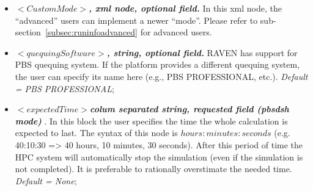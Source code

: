\begin{itemize}
\item $<CustomMode>$\textbf{\textit{, xml node, optional field.}} In this xml node, the ``advanced'' users can implement a newer ``mode''. Please refer to sub-section~\ref{subsec:runinfoadvanced} for advanced users.

\item $<quequingSoftware>$\textbf{\textit{, string, optional field.}} RAVEN has support for PBS quequing system. If the platform provides a different quequing system, the user can specify its name here (e.g., PBS PROFESSIONAL, etc.). \textit{Default = PBS PROFESSIONAL};

\item $<expectedTime>$\textbf{\textit{colum separated string, requested field (pbsdsh mode) }}. In this block the user specifies the time the whole calculation is expected to last. The syntax of this node is $hours:minutes:seconds$ (e.g. 40:10:30 => 40 hours, 10 minutes, 30 seconds). After this period of time the HPC system will automatically stop the simulation (even if the simulation is not completed). It is preferable to rationally overstimate the needed time. \textit{Default = None};
\end{itemize}

